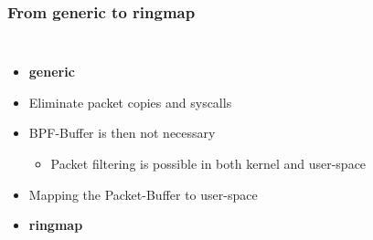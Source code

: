 \documentclass{beamer}
\begin{document}
\begin{frame}
\frametitle{From generic to ringmap}
\begin{columns}
\vspace{-1em}
\begin{itemize}
	\item<1->\textbf{generic}
	\item<2->Eliminate packet copies  and syscalls
	\item<3->BPF-Buffer is then not necessary
		\begin{itemize}
			\item<3->Packet filtering is possible in both kernel and 
				user-space
		\end{itemize}
	\item<4->Mapping the Packet-Buffer to user-space
	\item<5->[$\Rightarrow$]\textbf{ringmap}
\end{itemize}
\vspace{-2em}

\end{columns}
\end{frame}
\end{document}

